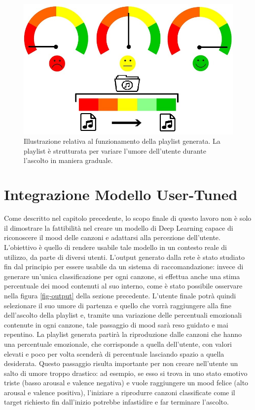 \documentclass[11pt]{report}
\begin{document}
\begin{figure}[h]
\centering
\includegraphics[scale = 1.5]{img/playlist-emotion.jpg}
\caption{Illustrazione relativa al funzionamento della playlist generata. La playlist è strutturata per variare l'umore dell'utente durante l'ascolto in maniera graduale.}
\label{fig:playlist-emozioni}
\end{figure}


\section{Integrazione Modello User-Tuned}

Come descritto nel capitolo precedente, lo scopo finale di questo lavoro non è solo il dimostrare la fattibilità nel creare un modello di Deep Learning capace di riconoscere il mood delle canzoni e adattarsi alla percezione dell'utente. L'obiettivo è quello di rendere usabile tale modello in un contesto reale di utilizzo, da parte di diversi utenti. L'output generato dalla rete è stato studiato fin dal principio per essere usabile da un sistema di raccomandazione: invece di generare un'unica classificazione per ogni canzone, si effettua anche una stima percentuale dei mood contenuti al suo interno, come è stato possibile osservare nella figura \ref{fig-output} della sezione precedente. L'utente finale potrà quindi selezionare il suo umore di partenza e quello che vorrà raggiungere alla fine dell'ascolto della playlist e, tramite una variazione delle percentuali emozionali contenute in ogni canzone, tale passaggio di mood sarà reso guidato e mai repentino. La playlist generata partirà la riproduzione dalle canzoni che hanno una percentuale emozionale, che corrisponde a quella dell'utente, con valori elevati e poco per volta scenderà di percentuale lasciando spazio a quella desiderata. Questo passaggio risulta importante per non creare nell'utente un salto di umore troppo drastico: ad esempio, se esso si trova in uno stato emotivo triste (basso arousal e valence negativa) e vuole raggiungere un mood felice (alto arousal e valence positiva), l'iniziare a riprodurre canzoni classificate come il target richiesto fin dall'inizio potrebbe infastidire e far terminare l'ascolto.
\end{document}
